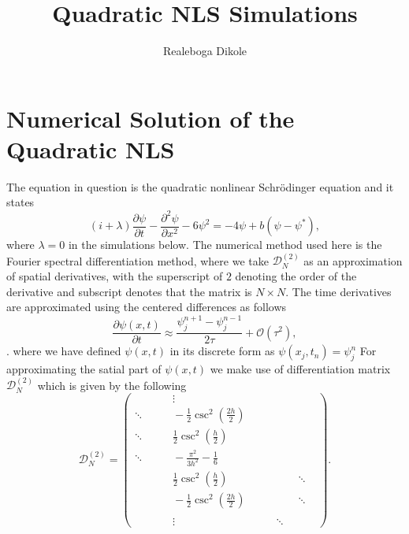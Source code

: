 \documentclass[12pt, letterpaper, twoside]{article}
\title{Quadratic NLS Simulations}
\author{Realeboga Dikole}
\begin{document}
\maketitle

\section{Numerical Solution of the Quadratic NLS}
The equation in question is the quadratic nonlinear Schr\"odinger equation and it states 
\begin{equation}\label{quad-NLS-lambda}
     \left(i + \lambda \right) \frac{\partial \psi}{\partial t} - \frac{\partial^2 \psi}{\partial x^2} - 6 \psi^{2} =  - 4 \psi + b (\psi - \psi^{*}),  
\end{equation}
where $\lambda = 0$ in the simulations below.
 The numerical method used here is the Fourier spectral differentiation method, where we take $\mathcal{D}_{N}^{(2)}$ as an approximation of spatial derivatives, with the superscript of $2$ denoting the order of the derivative and subscript denotes that the matrix is $N \times N$. The time derivatives are approximated using the centered differences as follows 
 \begin{equation}
     \frac{\partial \psi(x, t)}{\partial t} \approx \frac{\psi_{j}^{n+1} - \psi_{j}^{n-1}}{2 \tau} + \mathcal{O}(\tau^{2}), 
 \end{equation}. 
where we have defined $\psi(x, t)$ in its discrete form as $\psi(x_j, t_n) = \psi_{j}^{n} $
For approximating the satial part of $\psi(x, t)$ we make use of  differentiation matrix $\mathcal{D}_{N}^{(2)}$ which is given by the following 
\begin{equation}
\mathcal{D}_{N}^{(2)} = 
    \begin{pmatrix}
     & \qquad \vdots  \qquad& \\
     \ddots & \qquad -\frac{1}{2}\csc^{2}\left( \frac{2h}{2}\right) \qquad & \\
     \ddots &  \qquad  \frac{1}{2}\csc^2 \left( \frac{h}{2}\right) \qquad &\\
    \ddots & \qquad   - \frac{\pi^2}{3h^2} - \frac{1}{6}  \\
     & \qquad  \frac{1}{2}\csc^2\left( \frac{h}{2}\right) & \qquad \ddots \\
     & \qquad  - \frac{1}{2}\csc^2\left( \frac{2h}{2}\right) &\qquad  \ddots\\ \\
     
     & \qquad \vdots \qquad & \ddots&
    \end{pmatrix}.
\end{equation}
\end{document}
